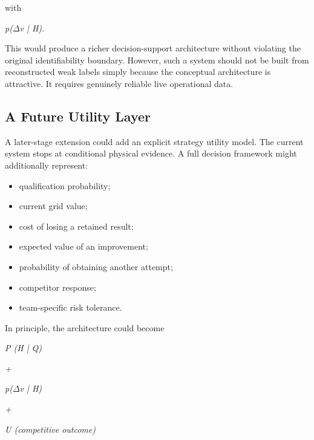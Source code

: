 with

\begin{center}\textit{p(\ensuremath{\Delta}v | H).}\end{center}

This would produce a richer decision-support architecture without violating the original identifiability boundary. However, such a system should not be built from reconstructed weak labels simply because the conceptual architecture is attractive. It requires genuinely reliable live operational data.

\subsection{A Future Utility Layer}
A later-stage extension could add an explicit strategy utility model. The current system stops at conditional physical evidence. A full decision framework might additionally represent:

\begin{itemize}
\item qualification probability;
\item current grid value;
\item cost of losing a retained result;
\item expected value of an improvement;
\item probability of obtaining another attempt;
\item competitor response;
\item team-specific risk tolerance.
\end{itemize}

In principle, the architecture could become

\begin{center}\textit{P (H | Q)}\end{center}

\begin{center}\textit{+}\end{center}

\begin{center}\textit{p(\ensuremath{\Delta}v | H)}\end{center}

\begin{center}\textit{+}\end{center}

\begin{center}\textit{U (competitive outcome)}\end{center}

